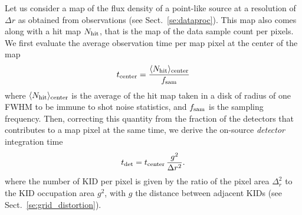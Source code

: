 Let us consider a map of the flux density of a point-like source at a
resolution of $\Delta r$ as obtained from observations (see
Sect.~\ref{se:dataproc}).
This map also comes along with a hit map $N_{\rm{hit}}$, that is the
map of the data sample count per pixels. We first evaluate the
average observation time per map pixel at the center of the map
%
%
\begin{equation}
t_{\rm{center}} = \frac{\langle N_{\rm{hit}}\rangle_{\rm{center}}}{f_{\rm{sam}}} 
\end{equation}
where $\langle N_{\rm{hit}}\rangle_{\rm{center}}$ is the average of
the hit map taken in a disk of radius of one FWHM to be immune to shot
noise statistics, and $f_{\rm{sam}}$ is the sampling frequency. 
Then, correcting this quantity from the fraction of the detectors that
contributes to a map pixel at the same time, we derive the on-source
\emph{detector} integration time
%
\begin{equation}
  t_{\rm{det}} = t_{\rm{center}}\, \frac{g^2}{\Delta r^2}.
\label{eq:t_det}
\end{equation}
%
where the number of KID per pixel is given by the ratio of the
pixel area $\Delta_r^2$ to the KID occupation area $g^2$, with $g$
the distance between adjacent KIDs (see
Sect.~\ref{se:grid_distortion}).

%
%

